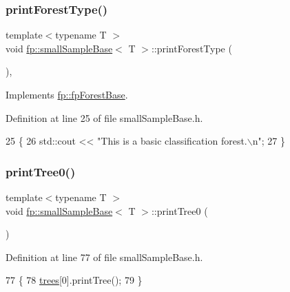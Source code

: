 \subsubsection{\texorpdfstring{print\+Forest\+Type()}{printForestType()}}
{\footnotesize\ttfamily template$<$typename T $>$ \\
void \hyperlink{classfp_1_1smallSampleBase}{fp\+::small\+Sample\+Base}$<$ T $>$\+::print\+Forest\+Type (\begin{DoxyParamCaption}{ }\end{DoxyParamCaption})\hspace{0.3cm}{\ttfamily [inline]}, {\ttfamily [virtual]}}



Implements \hyperlink{classfp_1_1fpForestBase_a5e200f603cca94bb5d9f357489f07e97}{fp\+::fp\+Forest\+Base}.



Definition at line 25 of file small\+Sample\+Base.\+h.


\begin{DoxyCode}
25                                   \{
26                 std::cout << \textcolor{stringliteral}{"This is a basic classification forest.\(\backslash\)n"};
27             \}
\end{DoxyCode}
\mbox{\label{classfp_1_1smallSampleBase_a5236048d1d219a61b74a6f47e344711d}} 
\subsubsection{\texorpdfstring{print\+Tree0()}{printTree0()}}
{\footnotesize\ttfamily template$<$typename T $>$ \\
void \hyperlink{classfp_1_1smallSampleBase}{fp\+::small\+Sample\+Base}$<$ T $>$\+::print\+Tree0 (\begin{DoxyParamCaption}{ }\end{DoxyParamCaption})\hspace{0.3cm}{\ttfamily [inline]}}



Definition at line 77 of file small\+Sample\+Base.\+h.


\begin{DoxyCode}
77                              \{
78                 \hyperlink{classfp_1_1smallSampleBase_a9a3d92948248f1809d9f025b553512b6}{trees}[0].printTree();
79             \}
\end{DoxyCode}
\mbox{\label{classfp_1_1smallSampleBase_a02b01949b6ed9cc6644b045a468609cc}} 
